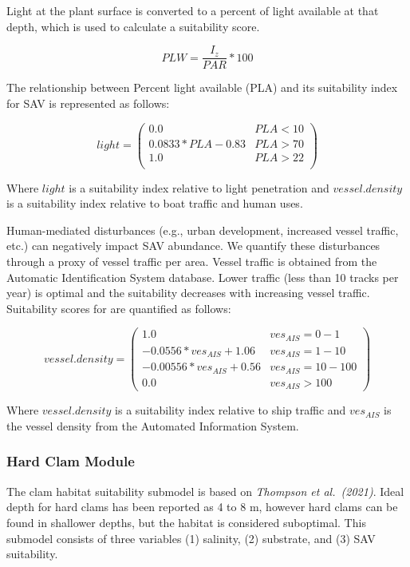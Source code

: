 \documentclass[
]{book}
\begin{document}
Light at the plant surface is converted to a percent of light available at that depth, which is used to calculate a suitability score.

\[PLW = \frac{I_{z}}{PAR} * 100\]

The relationship between Percent light available (PLA) and its suitability index for SAV is represented as follows:

\[light = \begin{pmatrix} 0.0 & PLA<10\\
0.0833*PLA-0.83 & PLA>70\\
1.0 & PLA>22\\
\end{pmatrix}\]

Where \(light\) is a suitability index relative to light penetration and \(vessel.density\) is a suitability index relative to boat traffic and human uses.

Human-mediated disturbances (e.g., urban development, increased vessel traffic, etc.) can negatively impact SAV abundance. We quantify these disturbances through a proxy of vessel traffic per area. Vessel traffic is obtained from the Automatic Identification System database. Lower traffic (less than 10 tracks per year) is optimal and the suitability decreases with increasing vessel traffic. Suitability scores for are quantified as follows:

\[vessel.density = \begin{pmatrix} 1.0 & ves_{AIS}=0-1\\
-0.0556*ves_{AIS}+1.06 & ves_{AIS}=1-10\\
-0.00556*ves_{AIS}+0.56 & ves_{AIS}=10-100\\
0.0 & ves_{AIS}>100
\end{pmatrix}\]

Where \(vessel.density\) is a suitability index relative to ship traffic and \(ves_{AIS}\) is the vessel density from the Automated Information System.

\hypertarget{hard-clam-module}{%
\subsubsection{Hard Clam Module}\label{hard-clam-module}}

The clam habitat suitability submodel is based on \emph{Thompson et al.~(2021)}. Ideal depth for hard clams has been reported as 4 to 8 m, however hard clams can be found in shallower depths, but the habitat is considered suboptimal. This submodel consists of three variables (1) salinity, (2) substrate, and (3) SAV suitability.
\end{document}
